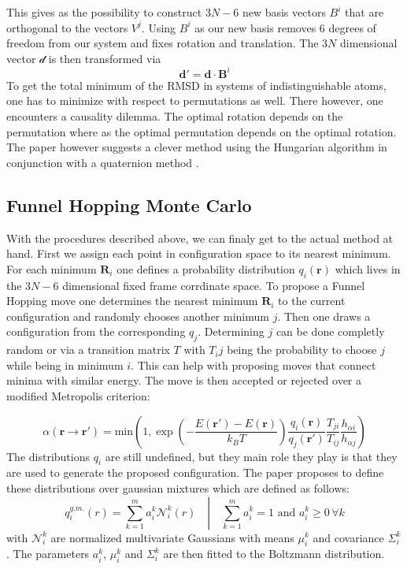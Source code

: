 \documentclass[11pt]{scrartcl} %
\begin{document}
This gives as the possibility to construct $3N-6$ new basis vectors $B^i$ that are orthogonal to the vectors $V^j$. Using $B^i$ as our new basis removes 6 degrees of freedom from our system and fixes rotation and translation. The $3N$ dimensional vector $\mathcal{d}$ is then transformed via
\begin{equation}
	\mathbf{d}'=\mathbf{d}\cdot\mathbf{B}^i
\end{equation}
To get the total minimum of the RMSD in systems of indistinguishable atoms, one has to minimize with respect to permutations as well. There however, one encounters a causality dilemma. The optimal rotation depends on the permutation where as the optimal permutation depends on the optimal rotation. The paper however suggests a clever method using the Hungarian algorithm \cite{Kuhn1955} in conjunction with a quaternion method \cite{Coutsias2004}.
\subsection{Funnel Hopping Monte Carlo}
With the procedures described above, we can finaly get to the actual method at hand. First we assign each point in configuration space to its nearest minimum. For each minimum $\mathbf{R}_i$ one defines a probability distribution $q_i(\mathbf{r})$ which lives in the $3N-6$ dimensional fixed frame corrdinate space. To propose a Funnel Hopping move one determines the nearest minimum $\mathbf{R}_i$ to the current configuration and randomly chooses another minimum $j$. Then one draws a configuration from the corresponding $q_j$. Determining $j$ can be done completly random or via a transition matrix $T$ with $T_ij$ being the probability to choose $j$ while being in minimum $i$. This can help with proposing moves that connect minima with similar energy. The move is then accepted or rejected over a modified Metropolis criterion:

\begin{equation}
	\alpha(\mathbf{r}\rightarrow\mathbf{r}')=\text{min}\left(1,\exp\left(-\frac{E(\mathbf{r}')-E(\mathbf{r})}{k_BT}\right)\frac{q_i(\mathbf{r})}{q_j(\mathbf{r}')}\frac{T_{ji}}{T_{ij}}\frac{h_{\alpha i}}{h_{\alpha j}}\right)	
\end{equation}
The distributions $q_i$ are still undefined, but they main role they play is that they are used to generate the proposed configuration. The paper proposes to define these distributions over gaussian mixtures which are defined as follows:
\begin{equation}
	q_i^{g.m.}(r)=\left.\sum_{k=1}^m a_i^k \mathcal{N}_i^k(r) \quad\right|\quad \sum_{k=1}^m a_i^k=1\text{ and } a_i^k \geq0\,\forall k
\end{equation}
with $\mathcal{N}_i^k$ are normalized multivariate Gaussians with means $\mu^k_i$ and covariance $\Sigma_i^k$. The parameters $a_i^k$, $\mu_i^k$ and $\Sigma_i^k$ are then fitted to the Boltzmann distribution.


\newpage
\printbibliography[heading=bibintoc]
\end{document}
